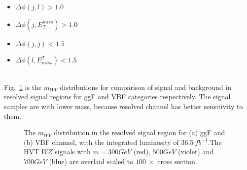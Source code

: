 \begin{itemize}
	\item $\Delta\phi(j,l)>1.0$
	\item $\Delta\phi(j,E^{miss}_{T})>1.0$
	\item $\Delta\phi(j,j)<1.5$
	\item $\Delta\phi(l,E^{T}_{miss})<1.5$
\end{itemize}
\noindent
\\Fig.~\ref{Fig:ResolvedSR} is the $m_{WV}$ distributions for comparison of signal and background in resolved signal regions for ggF and VBF categories respectively. The signal samples are with lower mass, because resolved channel has better sensitivity to them. 
\begin{figure}[h]
	\centering
	\caption{The $m_{WV}$ distribution in the resolved signal region for (a) ggF and (b) VBF channel, with the integrated luminosity of $36.5~fb^{-1}$.The HVT $WZ$ signals with $m=300GeV$ (red), $500GeV$ (violet) and $700GeV$ (blue) are overlaid 
		scaled to $100 ~\times$ cross section.}
	\label{Fig:ResolvedSR}
\end{figure}
